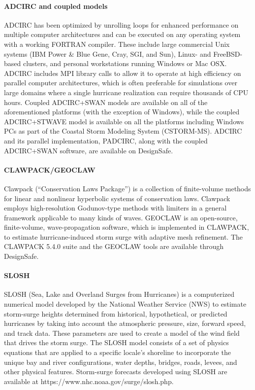 \paragraph{ADCIRC and coupled models} ADCIRC has been optimized by unrolling loops for enhanced performance on multiple computer architectures and can be executed on any operating system with a working FORTRAN compiler. These include large commercial Unix systems (IBM Power \& Blue Gene, Cray, SGI, and Sun), Linux- and FreeBSD-based clusters, and personal workstations running Windows or Mac OSX. ADCIRC includes MPI library calls to allow it to operate at high efficiency on parallel computer architectures, which is often preferable for simulations over large domains where a single hurricane realization can require thousands of CPU hours. Coupled ADCIRC+SWAN models are available on all of the aforementioned platforms (with the exception of Windows), while the coupled ADCIRC+STWAVE model is available on all the platforms including Windows PCs as part of the Coastal Storm Modeling System (CSTORM-MS). ADCIRC and its parallel implementation, PADCIRC, along with the coupled ADCIRC+SWAN software, are available on DesignSafe.

\paragraph{CLAWPACK/GEOCLAW} Clawpack (``Conservation Laws Package'') is a collection of finite-volume methods for linear and nonlinear hyperbolic systems of conservation laws. Clawpack employs high-resolution Godunov-type methods with limiters in a general framework applicable to many kinds of waves. GEOCLAW is an open-source, finite-volume, wave-propagation software, which is implemented in CLAWPACK, to estimate hurricane-induced storm surge with adaptive mesh refinement. The CLAWPACK 5.4.0 suite and the GEOCLAW tools are available through DesignSafe.

\paragraph{SLOSH} SLOSH (Sea, Lake and Overland Surges from Hurricanes) is a computerized numerical model developed by the National Weather Service (NWS) to estimate storm-surge heights determined from historical, hypothetical, or predicted hurricanes by taking into account the atmospheric pressure, size, forward speed, and track data. These parameters are used to create a model of the wind field that drives the storm surge. The SLOSH model consists of a set of physics equations that are applied to a specific locale's shoreline to incorporate the unique bay and river configurations, water depths, bridges, roads, levees, and other physical features. Storm-surge forecasts developed using SLOSH are available at https://www.nhc.noaa.gov/surge/slosh.php.

